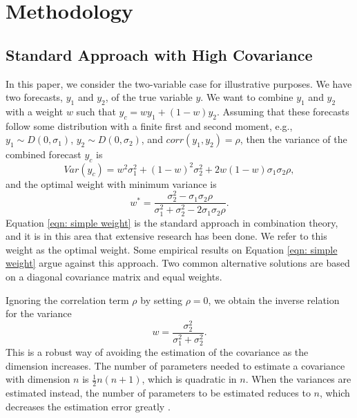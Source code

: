 \documentclass[11pt]{article}
\begin{document}
	
	\section{Methodology}\label{methodology}
	
	\subsection{Standard Approach with High Covariance}\label{standard-approach}
	
	In this paper, we consider the two-variable case for illustrative purposes. We have
	two forecasts, \(y_1\) and \(y_2\), of the true variable \(y\). We want
	to combine \(y_1\) and \(y_2\) with a weight \(w\) such that 
	\(y_c = w y_1 + (1-w) y_2\). Assuming that these forecasts follow some distribution with a finite first and second moment, e.g.,
	\(y_1 \sim D(0,\sigma_1)\), \(y_2 \sim D(0,\sigma_2)\), and
	\(corr(y_1,y_2)=\rho\), then the variance of the combined forecast
	\(y_c\) is
	\begin{equation}
	\label{eqn: var yc}
	Var(y_c) = w^2\sigma_1^2+ (1-w)^2\sigma_2^2+2w(1-w)\sigma_1\sigma_2\rho,
	\end{equation}
	and the optimal weight with minimum variance is
	\begin{equation}
	\label{eqn: simple weight}
	w^*=\frac{\sigma_2^2-\sigma_1\sigma_2\rho}{\sigma_1^2+\sigma_2^2 -2\sigma_1\sigma_2\rho}.
	\end{equation}
	Equation \ref{eqn: simple weight} is the standard approach in
	combination theory, and it is in this area that extensive research has been done. We refer to this weight as the optimal weight. Some empirical results on Equation \ref{eqn: simple weight} argue against this approach. Two common
	alternative solutions are based on a diagonal covariance matrix and equal weights.
	
	Ignoring the correlation term \(\rho\) by setting \(\rho=0\), we obtain the
	inverse relation for the variance
	\begin{equation}
	\label{eqn: simple weight no corr}
	w=\frac{\sigma_2^2}{\sigma_1^2+\sigma_2^2}.
	\end{equation}
	This is a robust way of avoiding the estimation of the covariance as the
	dimension increases. The number of parameters needed to estimate a
	covariance with dimension \(n\) is \(\frac{1}{2}n(n+1)\), which is
	quadratic in \(n\). When the variances are estimated instead, the
	number of parameters to be estimated reduces to \(n\), which 
	decreases the estimation error greatly \citep{Stock2001}.
	
\end{document}
